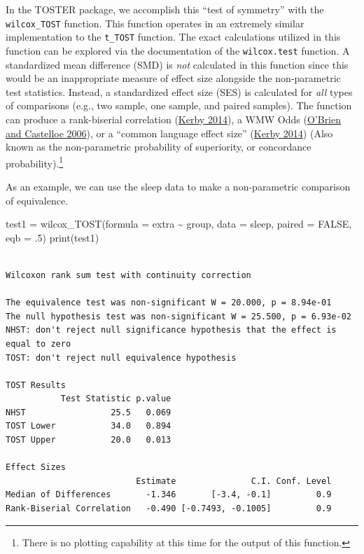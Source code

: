 \documentclass[
]{interact}
\newenvironment{Shaded}{\begin{snugshade}}{\end{snugshade}}
\newcommand{\AttributeTok}[1]{\textcolor[rgb]{0.40,0.45,0.13}{#1}}
\newcommand{\ConstantTok}[1]{\textcolor[rgb]{0.56,0.35,0.01}{#1}}
\newcommand{\DecValTok}[1]{\textcolor[rgb]{0.68,0.00,0.00}{#1}}
\newcommand{\FunctionTok}[1]{\textcolor[rgb]{0.28,0.35,0.67}{#1}}
\newcommand{\NormalTok}[1]{\textcolor[rgb]{0.00,0.23,0.31}{#1}}
\newcommand{\OtherTok}[1]{\textcolor[rgb]{0.00,0.23,0.31}{#1}}
\newcommand{\SpecialCharTok}[1]{\textcolor[rgb]{0.37,0.37,0.37}{#1}}
\begin{document}
In the TOSTER package, we accomplish this ``test of symmetry'' with the
\texttt{wilcox\_TOST} function. This function operates in an extremely
similar implementation to the \texttt{t\_TOST} function. The exact
calculations utilized in this function can be explored via the
documentation of the \texttt{wilcox.test} function. A standardized mean
difference (SMD) is \emph{not} calculated in this function since this
would be an inappropriate measure of effect size alongside the
non-parametric test statistics. Instead, a standardized effect size
(SES) is calculated for \emph{all} types of comparisons (e.g., two
sample, one sample, and paired samples). The function can produce a
rank-biserial correlation (\protect\hyperlink{ref-Kerby_2014}{Kerby
2014}), a WMW Odds (\protect\hyperlink{ref-wmwodds}{O'Brien and
Castelloe 2006}), or a ``common language effect size''
(\protect\hyperlink{ref-Kerby_2014}{Kerby 2014}) (Also known as the
non-parametric probability of superiority, or concordance
probability).\footnote{There is no plotting capability at this time for
  the output of this function.}

\newpage

As an example, we can use the sleep data to make a non-parametric
comparison of equivalence.

\begin{Shaded}
\begin{Highlighting}[]
\NormalTok{test1 }\OtherTok{=} \FunctionTok{wilcox\_TOST}\NormalTok{(}\AttributeTok{formula =}\NormalTok{ extra }\SpecialCharTok{\textasciitilde{}}\NormalTok{ group,}
                      \AttributeTok{data =}\NormalTok{ sleep,}
                      \AttributeTok{paired =} \ConstantTok{FALSE}\NormalTok{,}
                      \AttributeTok{eqb =}\NormalTok{ .}\DecValTok{5}\NormalTok{)}
\FunctionTok{print}\NormalTok{(test1)}
\end{Highlighting}
\end{Shaded}

\begin{verbatim}

Wilcoxon rank sum test with continuity correction

The equivalence test was non-significant W = 20.000, p = 8.94e-01
The null hypothesis test was non-significant W = 25.500, p = 6.93e-02
NHST: don't reject null significance hypothesis that the effect is equal to zero 
TOST: don't reject null equivalence hypothesis

TOST Results 
           Test Statistic p.value
NHST                 25.5   0.069
TOST Lower           34.0   0.894
TOST Upper           20.0   0.013

Effect Sizes 
                          Estimate               C.I. Conf. Level
Median of Differences       -1.346       [-3.4, -0.1]         0.9
Rank-Biserial Correlation   -0.490 [-0.7493, -0.1005]         0.9
\end{verbatim}
\end{document}

